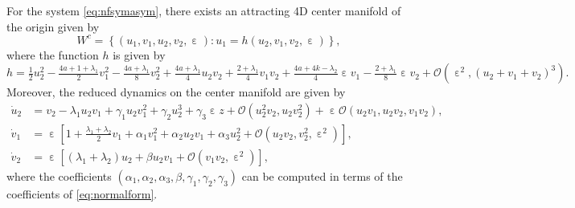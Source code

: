 \documentclass[10pt,a4paper]{amsart}
\DeclareMathOperator{\eps}{\varepsilon}
\begin{document}
\begin{proposition}
For the system \eqref{eq:nfsymasym}, there exists an attracting 4D center manifold of the origin given by 
%
\[ W^c = \left\{ (u_1,v_1,u_2,v_2,\eps) : 
u_1 = h(u_2,v_1,v_2,\eps)
\right\}, \]
%
where the function $h$ is given by 
%
\[ h = \tfrac{1}{2}u_2^2 -\tfrac{4a+1+\lambda_1}{2}v_1^2 - \tfrac{4a+\lambda_1}{8} v_2^2+\tfrac{4a+\lambda_1}{4} u_2 v_2 + \tfrac{2+\lambda_1}{4} v_1 v_2 +\tfrac{4a+4k-\lambda_2}{4} \eps v_1 - \tfrac{2+\lambda_1}{8} \eps v_2 + \mathcal O \left( \eps^2,(u_2+v_1+v_2)^3 \right). \]
%
Moreover, the reduced dynamics on the center manifold are given by
%
\begin{equation} \label{eq:dynamicsonWc}
  \begin{split}
    \dot u_2 &= v_2 - \lambda_1 u_2 v_1 + \gamma_1 u_2 v_1^2 + \gamma_2 u_2^3 + \gamma_3 \eps z + \mathcal O \left( u_2^2 v_2, u_2 v_2^2  \right) + \eps \mathcal O \left( u_2 v_1, u_2 v_2, v_1 v_2 \right), \\
    \dot v_1 &= \eps \left[ 1 + \tfrac{\lambda_1+\lambda_2}{2} v_1 + \alpha_1 v_1^2 + \alpha_2 u_2 v_1 + \alpha_3 u_2^2 + \mathcal O \left( u_2 v_2, v_2^2, \eps^2 \right) \right], \\
    \dot v_2 &= \eps \left[ (\lambda_1+\lambda_2) u_2 + \beta u_2 v_1 + \mathcal O \left( v_1 v_2, \eps^2 \right) \right],
  \end{split}
\end{equation}
%
where the coefficients $(\alpha_1,\alpha_2,\alpha_3,\beta,\gamma_1,\gamma_2,\gamma_3)$ can be computed in terms of the coefficients of \eqref{eq:normalform}.
\end{proposition}
\end{document}
